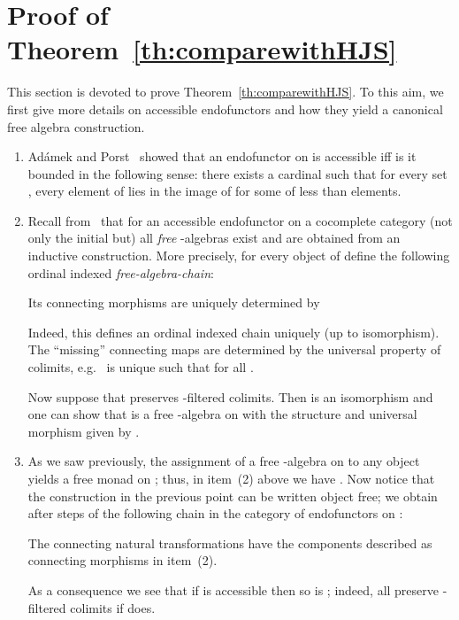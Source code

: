 \documentclass[oribibl,envcountsame,envcountsect,runningheads]{llncs}
\renewcommand{\>}{\rangle}
\begin{document}
\section{Proof of Theorem~\ref{th:comparewithHJS}}\label{app:proofthComparewithHJS}

This section is devoted to prove Theorem~\ref{th:comparewithHJS}. To this aim, we first give more details on accessible endofunctors and how they yield a canonical free algebra construction.

\begin{remark}
  \label{rem:chain}
  \begin{enumerate}[(1)]
  \item \label{pt:bounded} Ad\'amek and Porst~\cite{ap:04} showed that an endofunctor  on  is
    accessible iff is it bounded in the following sense: there exists
    a cardinal  such that for every set , every element of
     lies in the image of  for some 
    of less than  elements.

  \item \label{pt:HaccessibleFreeAlg} Recall from~\cite{adamek:74} that for an accessible endofunctor
     on a cocomplete category  (not only the initial but) all
    \emph{free} -algebras exist and are obtained from an inductive
    construction. More precisely, for every object  of  define
    the following ordinal indexed \emph{free-algebra-chain}:
    
    Its connecting morphisms  are
    uniquely determined by
    
    Indeed, this defines an ordinal indexed chain uniquely (up to
    isomorphism). The ``missing'' connecting maps are determined by
    the universal property of colimits, e.g.~ is
    unique such that  for all .

    Now suppose that  preserves -filtered
    colimits. Then  is an isomorphism and one
    can show that  is a free -algebra on  with the
    structure and universal morphism given by
    .
  \item \label{pt:freeHaccessible} As we saw previously, the assignment of a free -algebra on 
    to any object  yields a free monad on ; thus, in item~(2)
    above we have . Now notice that the construction
    in the previous point can be written object free; we obtain 
    after  steps of the following chain in the category of
    endofunctors on :
    
    The connecting natural transformations  have the
    components described as connecting morphisms in item~(2).

    As a consequence we see that if  is accessible then so is
    ; indeed, all   preserve -filtered colimits if
     does.
  \end{enumerate}
\end{remark}
\end{document}
